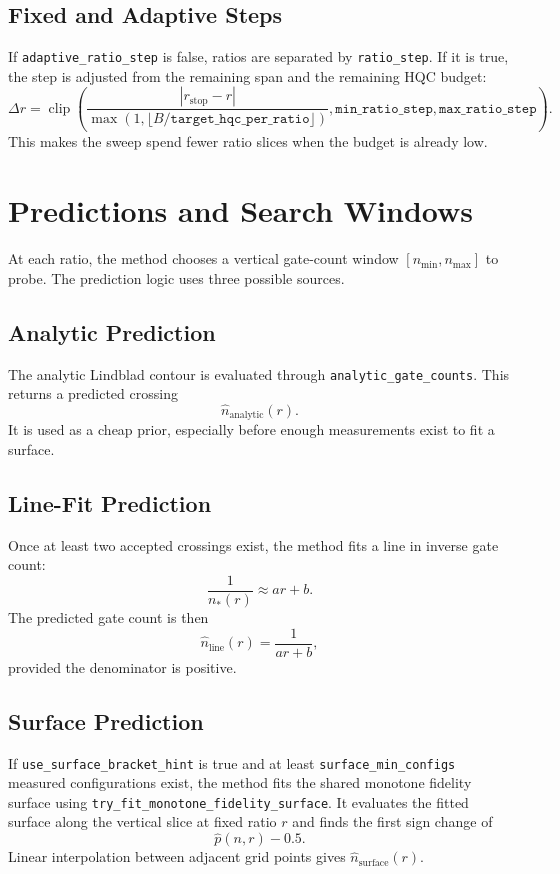 \documentclass[11pt]{article}
\begin{document}
\subsection{Fixed and Adaptive Steps}

If \texttt{adaptive\_ratio\_step} is false, ratios are separated by
\texttt{ratio\_step}. If it is true, the step is adjusted from the remaining
span and the remaining HQC budget:
\[
    \Delta r =
    \operatorname{clip}
    \left(
        \frac{|r_{\mathrm{stop}} - r|}
             {\max(1, \lfloor B / \texttt{target\_hqc\_per\_ratio}\rfloor)},
        \texttt{min\_ratio\_step},
        \texttt{max\_ratio\_step}
    \right).
\]
This makes the sweep spend fewer ratio slices when the budget is already low.

\section{Predictions and Search Windows}

At each ratio, the method chooses a vertical gate-count window $[n_{\min}, n_{\max}]$
to probe. The prediction logic uses three possible sources.

\subsection{Analytic Prediction}

The analytic Lindblad contour is evaluated through
\texttt{analytic\_gate\_counts}. This returns a predicted crossing
\[
    \hat n_{\mathrm{analytic}}(r).
\]
It is used as a cheap prior, especially before enough measurements exist to
fit a surface.

\subsection{Line-Fit Prediction}

Once at least two accepted crossings exist, the method fits a line in inverse
gate count:
\[
    \frac{1}{n_*(r)} \approx a r + b.
\]
The predicted gate count is then
\[
    \hat n_{\mathrm{line}}(r) = \frac{1}{a r + b},
\]
provided the denominator is positive.

\subsection{Surface Prediction}

If \texttt{use\_surface\_bracket\_hint} is true and at least
\texttt{surface\_min\_configs} measured configurations exist, the method fits
the shared monotone fidelity surface using
\texttt{try\_fit\_monotone\_fidelity\_surface}. It evaluates the fitted
surface along the vertical slice at fixed ratio $r$ and finds the first sign
change of
\[
    \hat p(n, r) - 0.5.
\]
Linear interpolation between adjacent grid points gives
$\hat n_{\mathrm{surface}}(r)$.
\end{document}
